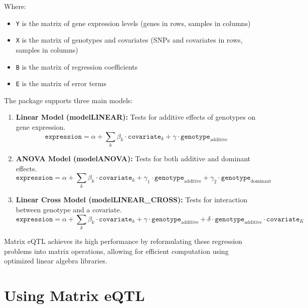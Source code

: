 \documentclass[12pt,a4paper]{article}
\begin{document}
Where:
\begin{itemize}
    \item \texttt{Y} is the matrix of gene expression levels (genes in rows, samples in columns)
    \item \texttt{X} is the matrix of genotypes and covariates (SNPs and covariates in rows, samples in columns)
    \item \texttt{B} is the matrix of regression coefficients
    \item \texttt{E} is the matrix of error terms
\end{itemize}

The package supports three main models:

\begin{enumerate}
    \item \textbf{Linear Model (modelLINEAR):} Tests for additive effects of genotypes on gene expression.
    \begin{equation}
    \texttt{expression} = \alpha + \sum_{k} \beta_k \cdot \texttt{covariate}_k + \gamma \cdot \texttt{genotype}_{\text{additive}}
    \end{equation}
    
    \item \textbf{ANOVA Model (modelANOVA):} Tests for both additive and dominant effects.
    \begin{equation}
    \texttt{expression} = \alpha + \sum_{k} \beta_k \cdot \texttt{covariate}_k + \gamma_1 \cdot \texttt{genotype}_{\text{additive}} + \gamma_2 \cdot \texttt{genotype}_{\text{dominant}}
    \end{equation}
    
    \item \textbf{Linear Cross Model (modelLINEAR\_CROSS):} Tests for interaction between genotype and a covariate.
    \begin{equation}
    \texttt{expression} = \alpha + \sum_{k} \beta_k \cdot \texttt{covariate}_k + \gamma \cdot \texttt{genotype}_{\text{additive}} + \delta \cdot \texttt{genotype}_{\text{additive}} \cdot \texttt{covariate}_K
    \end{equation}
\end{enumerate}

Matrix eQTL achieves its high performance by reformulating these regression problems into matrix operations, allowing for efficient computation using optimized linear algebra libraries.

\section{Using Matrix eQTL}
\end{document}
